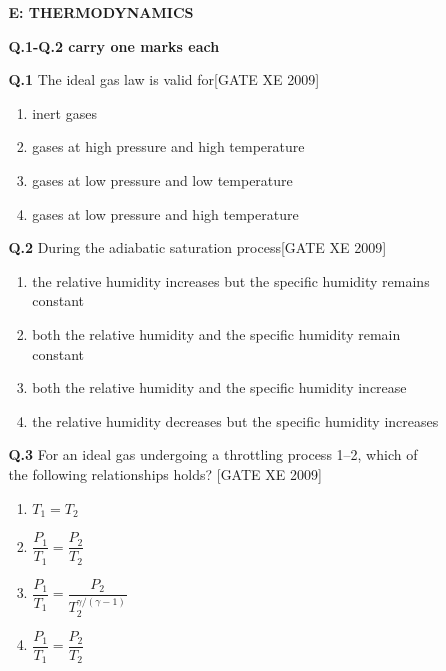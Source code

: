 \documentclass[journal,12pt,onecolumn]{IEEEtran}
\theoremstyle{remark}
\begin{document}
\begin{enumerate}
\begin{enumerate}
\begin{enumerate}
\begin{multicols}{2}
\begin{enumerate}
    \end{enumerate}
      \end{multicols}
   \clearpage
   \textbf{E: THERMODYNAMICS}

\vspace{0.5cm}

\textbf{Q.1-Q.2 carry one marks each}
\item[\textbf{Q.1}] The ideal gas law is valid for\hfill[GATE XE 2009]
\begin{multicols}{2}
\begin{enumerate}
    \item inert gases
    \item gases at high pressure and high temperature
    \item gases at low pressure and low temperature
    \item gases at low pressure and high temperature
\end{enumerate}
\end{multicols}

\vspace{0.3cm}

\item[\textbf{Q.2}] During the adiabatic saturation process\hfill[GATE XE 2009]
\begin{multicols}{2}
\begin{enumerate}
    \item the relative humidity increases but the specific humidity remains constant
    \item both the relative humidity and the specific humidity remain constant
    \item both the relative humidity and the specific humidity increase
    \item the relative humidity decreases but the specific humidity increases
\end{enumerate}
\end{multicols}

\vspace{0.3cm}

\item[\textbf{Q.3}] For an ideal gas undergoing a throttling process 1--2, which of the following relationships holds?
\hfill[GATE XE 2009]
\begin{multicols}{2}
\begin{enumerate}
    \item $T_1 = T_2$
    \item $\dfrac{P_1}{T_1} = \dfrac{P_2}{T_2}$
    \item $\dfrac{P_1}{T_1} = \dfrac{P_2}{T_2^{\gamma/(\gamma - 1)}}$
    \item $\dfrac{P_1}{T_1} = \dfrac{P_2}{T_2}$
\end{enumerate}
\end{multicols}


\end{enumerate}
\end{enumerate}
\end{enumerate}
\end{document}
